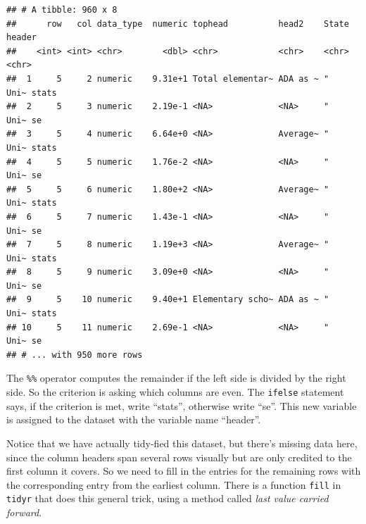 \documentclass[12pt,letterpaperpaper,openany]{book}
\newenvironment{Shaded}{\begin{snugshade}}{\end{snugshade}}
\newcommand{\KeywordTok}[1]{\textcolor[rgb]{0.13,0.29,0.53}{\textbf{#1}}}
\newcommand{\NormalTok}[1]{#1}
\newcommand{\OperatorTok}[1]{\textcolor[rgb]{0.81,0.36,0.00}{\textbf{#1}}}
\newcommand{\StringTok}[1]{\textcolor[rgb]{0.31,0.60,0.02}{#1}}
\begin{document}
\begin{verbatim}
## # A tibble: 960 x 8
##      row   col data_type  numeric tophead          head2    State    header
##    <int> <int> <chr>        <dbl> <chr>            <chr>    <chr>    <chr> 
##  1     5     2 numeric    9.31e+1 Total elementar~ ADA as ~ "   Uni~ stats 
##  2     5     3 numeric    2.19e-1 <NA>             <NA>     "   Uni~ se    
##  3     5     4 numeric    6.64e+0 <NA>             Average~ "   Uni~ stats 
##  4     5     5 numeric    1.76e-2 <NA>             <NA>     "   Uni~ se    
##  5     5     6 numeric    1.80e+2 <NA>             Average~ "   Uni~ stats 
##  6     5     7 numeric    1.43e-1 <NA>             <NA>     "   Uni~ se    
##  7     5     8 numeric    1.19e+3 <NA>             Average~ "   Uni~ stats 
##  8     5     9 numeric    3.09e+0 <NA>             <NA>     "   Uni~ se    
##  9     5    10 numeric    9.40e+1 Elementary scho~ ADA as ~ "   Uni~ stats 
## 10     5    11 numeric    2.69e-1 <NA>             <NA>     "   Uni~ se    
## # ... with 950 more rows
\end{verbatim}

The \texttt{\%\%} operator computes the remainder if the left side is divided by the right side.
So the criterion is asking which columns are even. The \texttt{ifelse} statement says,
if the criterion is met, write ``stats'', otherwise write ``se''. This new variable
is assigned to the dataset with the variable name ``header''.

Notice that we have actually tidy-fied this dataset, but there's missing data here, since
the column headers span several rows visually but are only credited to the first column it covers.
So we need to fill in the entries for the remaining rows with the corresponding entry from the earliest column.
There is a function \texttt{fill} in \texttt{tidyr} that does this general trick, using a method called \emph{last value carried forward}.

\begin{Shaded}
\end{Shaded}
\end{document}
